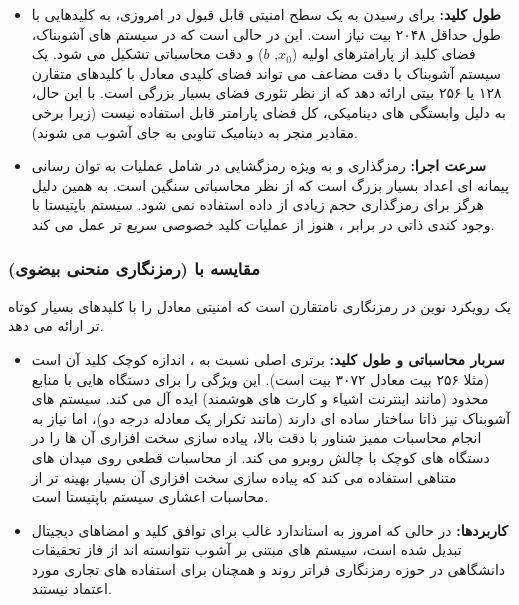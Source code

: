 \documentclass[12pt]{report}
\begin{document}
\begin{itemize}[leftmargin=*]
    \item \textbf{طول کلید:} برای رسیدن به یک سطح امنیتی قابل قبول 
    در  امروزی، به کلیدهایی با طول حداقل ۲۰۴۸ بیت نیاز است. این در حالی است که در 
    سیستم های آشوبناک، فضای کلید از پارامترهای اولیه ($x_0$, $b$) و دقت محاسباتی تشکیل می شود. 
    یک سیستم آشوبناک با دقت مضاعف می تواند فضای کلیدی معادل 
    با کلیدهای متقارن ۱۲۸ یا ۲۵۶ بیتی ارائه دهد که از نظر تئوری فضای بسیار بزرگی است. با این حال، 
    به دلیل وابستگی های دینامیکی، کل فضای پارامتر قابل استفاده نیست (زیرا برخی مقادیر منجر به 
    دینامیک تناوبی به جای آشوب می شوند).
    
    \item \textbf{سرعت اجرا:} رمزگذاری و به ویژه رمزگشایی در  شامل عملیات به توان رسانی 
    پیمانه ای اعداد بسیار بزرگ است که از نظر محاسباتی 
    سنگین است. به همین دلیل  هرگز برای رمزگذاری حجم زیادی از داده استفاده نمی شود. 
    سیستم باپتیستا با وجود کندی ذاتی در برابر ، هنوز از عملیات کلید خصوصی  سریع تر 
    عمل می کند.
\end{itemize}

\subsubsection{مقایسه با  (رمزنگاری منحنی بیضوی)}
 یک رویکرد نوین در رمزنگاری نامتقارن است که امنیتی معادل  را با کلیدهای بسیار 
کوتاه تر ارائه می دهد.

\begin{itemize}[leftmargin=*]
    \item \textbf{سربار محاسباتی و طول کلید:} برتری اصلی  نسبت به ، اندازه کوچک 
    کلید آن است (مثلا ۲۵۶ بیت  معادل ۳۰۷۲ بیت  است). این ویژگی  را برای 
    دستگاه هایی با منابع محدود (مانند اینترنت اشیاء و کارت های هوشمند) ایده آل می کند. سیستم های 
    آشوبناک نیز ذاتا ساختار ساده ای دارند (مانند تکرار یک معادله درجه دو)، اما نیاز به انجام 
    محاسبات ممیز شناور با دقت بالا، پیاده سازی سخت افزاری آن ها را در دستگاه های کوچک با چالش 
    روبرو می کند.  از محاسبات قطعی روی میدان های متناهی استفاده می کند که پیاده سازی 
    سخت افزاری آن بسیار بهینه تر از محاسبات اعشاری سیستم باپتیستا است.
    
    \item \textbf{کاربردها:} در حالی که  امروز به استاندارد غالب برای توافق کلید
     و امضاهای دیجیتال تبدیل شده است، سیستم های 
    مبتنی بر آشوب نتوانسته اند از فاز تحقیقات دانشگاهی در حوزه رمزنگاری فراتر روند و همچنان 
    برای استفاده های تجاری مورد اعتماد نیستند.
\end{itemize}
\end{document}
